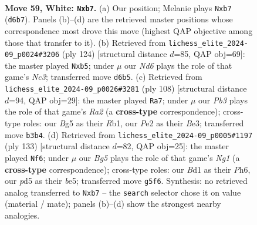 \documentclass[11pt]{article}
\begin{document}
\clearpage

\begin{figure}[p]\centering
\begin{subfigure}{0.46\textwidth}\centering
\resizebox{\linewidth}{!}{%
\newchessgame
\chessboard[
  setfen={n4k2/1p1n4/1b1N4/p2p2Bb/8/PP2P2p/4P3/3B2K1 w - - 0 59},
  showmover=false,
  pgfstyle=straightmove, color=movearrow, markmove={d6-b7}
]}
\caption{}
\end{subfigure}\hfill
\begin{subfigure}{0.46\textwidth}\centering
\resizebox{\linewidth}{!}{%
\newchessgame
\chessboard[
  setfen={8/1p6/1B2kp2/Pp1p2n1/3P2P1/2NK4/8/6b1 w - - 0 63},
  showmover=false,
  pgfstyle=straightmove, color=movearrow, markmove={c3-b5}
]}
\caption{}
\end{subfigure}
\\[4pt]
\begin{subfigure}{0.46\textwidth}\centering
\resizebox{\linewidth}{!}{%
\newchessgame
\chessboard[
  setfen={1r1b4/6p1/1Pb3Pk/4Pp2/2p1pP1p/2K1B3/R7/1R6 w - - 0 55},
  showmover=false,
  pgfstyle=straightmove, color=movearrow, markmove={a2-a7}
]}
\caption{}
\end{subfigure}\hfill
\begin{subfigure}{0.46\textwidth}\centering
\resizebox{\linewidth}{!}{%
\newchessgame
\chessboard[
  setfen={6n1/5k2/4p2p/p3BP1P/1bB1p1p1/1P6/5P2/5K2 b - - 0 67},
  showmover=false,
  pgfstyle=straightmove, color=movearrow, markmove={g8-f6}
]}
\caption{}
\end{subfigure}
\caption{\textbf{Move 59, White: \texttt{Nxb7}.} (a) Our position; Melanie plays \texttt{Nxb7} (\texttt{d6b7}). Panels (b)--(d) are the retrieved master positions whose correspondence most drove this move (highest QAP objective among those that transfer to it). (b) Retrieved from \texttt{lichess\_elite\_2024-09\_p0024\#3206} (ply 124) [structural distance $d$=85, QAP obj=69]: the master played \texttt{Nxb5}; under $\mu$ our \emph{Nd6} plays the role of that game's \emph{Nc3}; transferred move \texttt{d6b5}. (c) Retrieved from \texttt{lichess\_elite\_2024-09\_p0026\#3281} (ply 108) [structural distance $d$=94, QAP obj=29]: the master played \texttt{Ra7}; under $\mu$ our \emph{Pb3} plays the role of that game's \emph{Ra2} (a \textbf{cross-type} correspondence); cross-type roles: our \emph{B}g5 as their \emph{R}b1, our \emph{P}e2 as their \emph{B}e3; transferred move \texttt{b3b4}. (d) Retrieved from \texttt{lichess\_elite\_2024-09\_p0005\#1197} (ply 133) [structural distance $d$=82, QAP obj=25]: the master played \texttt{Nf6}; under $\mu$ our \emph{Bg5} plays the role of that game's \emph{Ng1} (a \textbf{cross-type} correspondence); cross-type roles: our \emph{B}d1 as their \emph{P}h6, our \emph{p}d5 as their \emph{b}e5; transferred move \texttt{g5f6}. Synthesis: no retrieved analog transferred to \texttt{Nxb7} -- the \texttt{search} selector chose it on value (material / mate); panels (b)--(d) show the strongest nearby analogies.}
\label{fig:thought-m116}
\end{figure}
\end{document}
